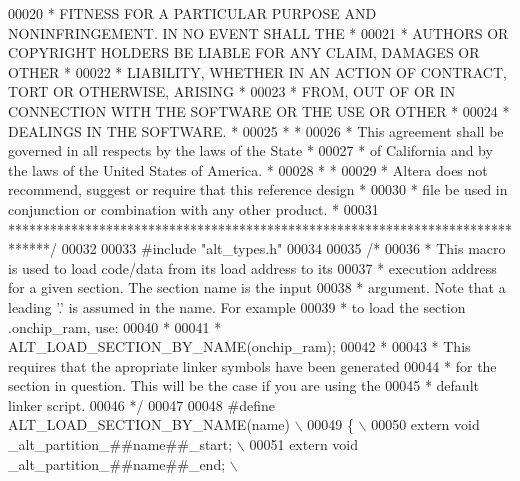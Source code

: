 \begin{DoxyCode}
00020 \textcolor{comment}{* FITNESS FOR A PARTICULAR PURPOSE AND NONINFRINGEMENT. IN NO EVENT SHALL THE *}
00021 \textcolor{comment}{* AUTHORS OR COPYRIGHT HOLDERS BE LIABLE FOR ANY CLAIM, DAMAGES OR OTHER      *}
00022 \textcolor{comment}{* LIABILITY, WHETHER IN AN ACTION OF CONTRACT, TORT OR OTHERWISE, ARISING     *}
00023 \textcolor{comment}{* FROM, OUT OF OR IN CONNECTION WITH THE SOFTWARE OR THE USE OR OTHER         *}
00024 \textcolor{comment}{* DEALINGS IN THE SOFTWARE.                                                   *}
00025 \textcolor{comment}{*                                                                             *}
00026 \textcolor{comment}{* This agreement shall be governed in all respects by the laws of the State   *}
00027 \textcolor{comment}{* of California and by the laws of the United States of America.              *}
00028 \textcolor{comment}{*                                                                             *}
00029 \textcolor{comment}{* Altera does not recommend, suggest or require that this reference design    *}
00030 \textcolor{comment}{* file be used in conjunction or combination with any other product.          *}
00031 \textcolor{comment}{******************************************************************************/}
00032 
00033 \textcolor{preprocessor}{#include "alt_types.h"}
00034 
00035 \textcolor{comment}{/*}
00036 \textcolor{comment}{ * This macro is used to load code/data from its load address to its }
00037 \textcolor{comment}{ * execution address for a given section. The section name is the input}
00038 \textcolor{comment}{ * argument. Note that a leading '.' is assumed in the name. For example}
00039 \textcolor{comment}{ * to load the section .onchip\_ram, use:}
00040 \textcolor{comment}{ * }
00041 \textcolor{comment}{ * ALT\_LOAD\_SECTION\_BY\_NAME(onchip\_ram);}
00042 \textcolor{comment}{ * }
00043 \textcolor{comment}{ * This requires that the apropriate linker symbols have been generated}
00044 \textcolor{comment}{ * for the section in question. This will be the case if you are using the}
00045 \textcolor{comment}{ * default linker script.}
00046 \textcolor{comment}{ */} 
00047 
00048 \textcolor{preprocessor}{#define ALT\_LOAD\_SECTION\_BY\_NAME(name)                         \(\backslash\)}
00049 \textcolor{preprocessor}{  \{                                                            \(\backslash\)}
00050 \textcolor{preprocessor}{    extern void \_alt\_partition\_##name##\_start;                 \(\backslash\)}
00051 \textcolor{preprocessor}{    extern void \_alt\_partition\_##name##\_end;                   \(\backslash\)}

\end{DoxyCode}
